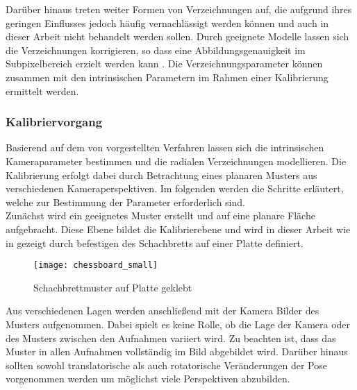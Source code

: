 
Darüber hinaus treten weiter Formen von Verzeichnungen auf, die aufgrund ihres geringen Einflusses jedoch häufig vernachlässigt werden können und auch in dieser Arbeit nicht behandelt werden sollen. Durch geeignete Modelle lassen sich die Verzeichnungen \red[softwareseitig] korrigieren, so dass eine Abbildungsgenauigkeit im Subpixelbereich erzielt werden kann \red[\cite{}]. Die Verzeichnungsparameter können zusammen mit den intrinsischen Parametern im Rahmen einer Kalibrierung ermittelt werden. 

\subsubsection{Kalibriervorgang}
Basierend auf dem von  vorgestellten Verfahren lassen sich die intrinsischen Kameraparameter bestimmen und die radialen Verzeichnungen modellieren. Die Kalibrierung erfolgt dabei durch Betrachtung eines planaren Musters aus verschiedenen Kameraperspektiven. Im folgenden werden die Schritte erläutert, welche zur Bestimmung der Parameter erforderlich sind.\\

Zunächst wird ein geeignetes Muster erstellt und auf eine planare Fläche aufgebracht. Diese Ebene bildet die Kalibrierebene und wird in dieser Arbeit wie in  gezeigt durch befestigen des Schachbretts auf einer Platte definiert. 

\begin{figure}[ht]
	\begin{center}
		\texttt{[image: chessboard\_small]}
		\caption{Schachbrettmuster auf Platte geklebt}
		\label{fig.chesscalib}
	\end{center}
\end{figure}

Aus verschiedenen Lagen werden anschließend mit der Kamera Bilder des Musters aufgenommen. Dabei spielt es keine Rolle, ob die Lage der Kamera oder des Musters zwischen den Aufnahmen variiert wird. Zu beachten ist, dass das Muster in allen Aufnahmen vollständig im Bild abgebildet wird. Darüber hinaus sollten sowohl translatorische als auch rotatorische Veränderungen der Pose vorgenommen werden um möglichst viele Perspektiven abzubilden. \\

